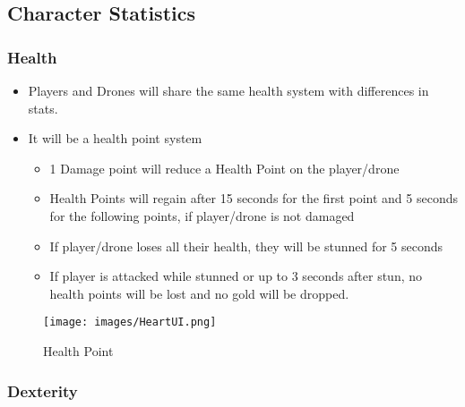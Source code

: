 \documentclass[10pt]{report}
\begin{document}
\subsection{Character Statistics}

\subsubsection{Health}

\begin{minipage}{.85\linewidth}
    \begin{itemize}
        \item Players and Drones will share the same health system with differences in stats.
        \item It will be a health point system
        \begin{itemize}
            \item 1 Damage point will reduce a Health Point on the player/drone
            \item Health Points will regain after 15 seconds for the first point and 5 seconds for the following points, if player/drone is not damaged
            \item If player/drone loses all their health, they will be stunned for 5 seconds
            \item If player is attacked while stunned or up to 3 seconds after stun, no health points will be lost and no gold will be dropped.    
        \end{itemize}
    \end{itemize}
\end{minipage} \hfill
\begin{minipage}{.13\linewidth}
    \begin{figure}[H]
        \centering
        \texttt{[image: images/HeartUI.png]}
        \caption{Health Point}
    \end{figure}
\end{minipage}

\subsubsection{Dexterity}
\end{document}
